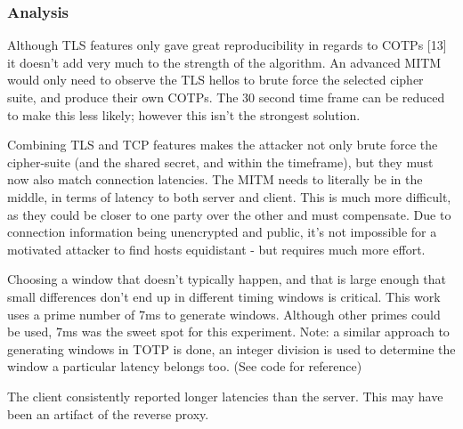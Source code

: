 \documentclass[a4paper, 11pt]{article} 				%
\begin{document}





\subsubsection{Analysis}
Although TLS features only gave great reproducibility in regards to COTPs [13] it doesn't add very much to the strength of the algorithm. An advanced MITM would only need to observe the TLS hellos to brute force the selected cipher suite, and produce their own COTPs. The 30 second time frame can be reduced to make this less likely; however this isn't the strongest solution.

Combining TLS and TCP features makes the attacker not only brute force the cipher-suite (and the shared secret, and within the timeframe), but they must now also match connection latencies. The MITM needs to literally be in the middle, in terms of latency to both server and client. This is much more difficult, as they could be closer to one party over the other and must compensate. Due to connection information being unencrypted and public, it's not impossible for a motivated attacker to find hosts equidistant - but requires much more effort.

Choosing a window that doesn't typically happen, and that is large enough that small differences don't end up in different timing windows is critical. This work uses a prime number of 7ms to generate windows. Although other primes could be used, 7ms was the sweet spot for this experiment. Note: a similar approach to generating windows in TOTP is done, an integer division is used to determine the window a particular latency belongs too. (See code for reference)

The client consistently reported longer latencies than the server. This may have been an artifact of the reverse proxy.




\end{document}
